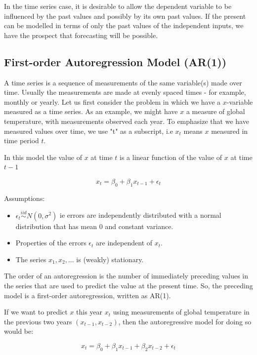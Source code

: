 \documentclass[a4paper]{article}
\theoremstyle{definition}
\begin{document}
In the time series case, it is desirable to allow the dependent variable to be influenced by the past values and possibly by its own past values. If the present can be modelled in terms of only the past values of the independent inputs, we have the prospect that forecasting will be possible.

\subsection{First-order Autoregression Model (AR(1))}
A time series is a sequence of measurements of the same variable(s) made over time. Usually the measurements are made at evenly spaced times - for example, monthly or yearly. Let us first consider the problem in which we have a $ x $-variable measured as a time series. As an example, we might have $ x $ a measure of global temperature, with measurements observed each year. 
To emphasize that we have measured values over time, we use "t" as a subscript, i.e $ x_t $ means $ x $ measured in time period $ t $. 

In this model the value of $ x $ at time $ t $ is a linear function of the value of $ x $ at time $ t-1 $

\begin{equation*}  
x_{t}=\beta_{0}+\beta_{1}x_{t-1}+\epsilon_{t}  
\end{equation*}

Assumptions:

\begin{itemize}
\item $ \epsilon_t \overset{iid}{\sim} N(0, \sigma^2) $ ie errors are independently distributed with a normal distribution that has mean 0 and constant variance.	
\item Properties of the errors $ \epsilon_t $ are independent of $ x_t $.
\item The series $ x_1,  x_2,  ...  $ is (weakly) stationary.
\end{itemize}

The order of an autoregression is the number of immediately preceding values in the series that are used to predict the value at the present time. So, the preceding model is a first-order autoregression, written as AR(1). 

If we want to predict $ x $ this year $ x_t $ using measurements of global temperature in the previous two years $ (x_{t-1}, x_{t-2}) $, then the autoregressive model for doing so would be:

\begin{equation*}  
x_{t}=\beta_{0}+\beta_{1}x_{t-1}+\beta_{2}x_{t-2}+\epsilon_{t}  
\end{equation*}
\end{document}
